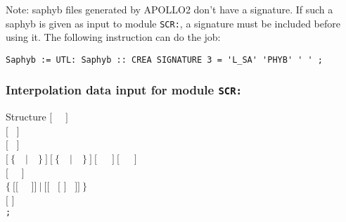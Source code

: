 Note: {\sc saphyb} files generated by APOLLO2 don't have a signature. If such a {\sc saphyb} is given as input
to module {\tt SCR:}, a signature must be included before using it. The following instruction
can do the job:
\begin{verbatim}
Saphyb := UTL: Saphyb :: CREA SIGNATURE 3 = 'L_SA' 'PHYB' ' ' ;
\end{verbatim}

\subsubsection{Interpolation data input for module {\tt SCR:}}\label{sect:descscr}

\vskip -0.5cm

\begin{DataStructure}{Structure }
$[$~ ~$]$ \\
$[$~ $]$ \\
$[$~ $]$ \\
$[~\{$~~$|$~~$\}~]~[~\{$~~$|$~~$\}~]~[$~~~$]~[$~~~$]$ \\
$[$~ ~$]$ \\
$\{~[[$~  ~$]]~|~[[$~  $[$  $]$  ~$]]~\}$ \\
$[$  $]$ \\
{\tt ;}
\end{DataStructure}

